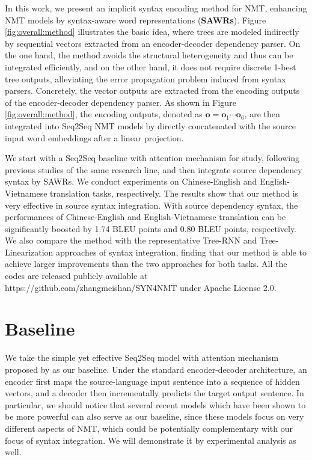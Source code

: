 \documentclass[11pt,a4paper]{article}
\begin{document}
\begin{CJK}{UTF8}{gbsn}
In this work, we present an implicit syntax encoding method for NMT,
enhancing NMT models by syntax-aware word representations (\textbf{SAWRs}).
Figure \ref{fig:overall:method} illustrates the basic idea,
where trees are modeled indirectly by sequential vectors extracted from an encoder-decoder dependency parser.
On the one hand, the method avoids the structural heterogeneity and thus can be integrated efficiently,
and on the other hand,
it does not require discrete 1-best tree outputs,
alleviating the error propagation problem induced from syntax parsers.
Concretely,
the vector outputs are extracted from the encoding outputs of the encoder-decoder dependency parser.
As shown in Figure \ref{fig:overall:method},
the encoding outputs, denoted as $\bm{o} = \bm{o}_1 \cdots \bm{o}_6$,
are then integrated into Seq2Seq NMT models by directly concatenated with the source input word embeddings after a linear projection.

We start with a Seq2Seq baseline with attention mechanism \cite{bahdanau2014neural} for study,
following previous studies of the same research line,
and then integrate source dependency syntax by SAWRs.
We conduct experiments on Chinese-English and English-Vietnamese translation tasks, respectively.
The results show that our method is very effective in source syntax integration.
With source dependency syntax, the performances of Chinese-English and English-Vietnamese translation
can be significantly boosted by 1.74 BLEU points and 0.80 BLEU points, respectively.
We also compare the method with the representative Tree-RNN and Tree-Linearization approaches of syntax integration,
finding that our method is able to achieve larger improvements than the two approaches for both tasks.
All the codes are released publicly available at https://github.com/zhangmeishan/SYN4NMT under Apache License 2.0.










\section{Baseline}
We take the simple yet effective Seq2Seq model with attention mechanism proposed by  as our baseline.
Under the standard encoder-decoder architecture,
an encoder first maps the source-language input sentence into a sequence of hidden vectors, and a decoder then incrementally predicts the target output sentence. In particular, we should notice that several recent models \cite{vaswani2017attention,zheng2017modeling,yongcheng:2018:ACLMain}
which have been shown to be more powerful can also serve
as our baseline,
since these models focus on very different aspects of NMT,
which could be potentially complementary with our focus of syntax integration.
We will demonstrate it by experimental analysis as well.




\end{CJK}
\end{document}
